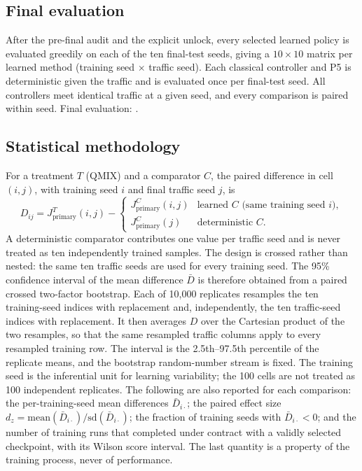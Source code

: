 \documentclass[review,12pt]{elsarticle}
\newcommand{\TBD}[1]{\textcolor{red}{\texttt{\detokenize{#1}}}}
\newcommand{\Jp}{J_{\mathrm{primary}}}
\begin{document}
\subsection{Final evaluation}
\label{subsec:final_eval}

After the pre-final audit and the explicit unlock, every selected learned
policy is evaluated greedily on each of the ten final-test seeds, giving
a $10\times10$ matrix per learned method (training seed $\times$ traffic
seed). Each classical controller and P5 is deterministic given the
traffic and is evaluated once per final-test seed. All controllers meet
identical traffic at a given seed, and every comparison is paired within
seed. Final evaluation: \TBD{TBD_AFTER_FINAL_EVALUATION}.

\subsection{Statistical methodology}
\label{subsec:statistics}

For a treatment $T$ (QMIX) and a comparator $C$, the paired difference in
cell $(i,j)$, with training seed $i$ and final traffic seed $j$, is
\begin{equation}
D_{ij}=\Jp^{T}(i,j)-
\begin{cases}
\Jp^{C}(i,j) & \text{learned $C$ (same training seed $i$)},\\
\Jp^{C}(j) & \text{deterministic $C$}.
\end{cases}
\label{eq:difference}
\end{equation}
A deterministic comparator contributes one value per traffic seed and
is never treated as ten independently trained samples. The design is
crossed rather than nested: the same ten traffic seeds are used for
every training seed. The 95\% confidence interval of the mean difference
$\bar D$ is therefore obtained from a paired crossed two-factor
bootstrap. Each of 10{,}000 replicates resamples the ten training-seed
indices with replacement and, independently, the ten traffic-seed
indices with replacement. It then averages $D$ over the Cartesian
product of the two resamples, so that the same resampled traffic columns
apply to every resampled training row. The interval is the 2.5th--97.5th
percentile of the replicate means, and the bootstrap random-number
stream is fixed.
The training seed is the inferential unit for learning variability; the
100 cells are not treated as 100 independent replicates. The following
are also reported for each comparison:
the per-training-seed mean differences $\bar D_{i\cdot}$; the paired
effect size $d_z=\mathrm{mean}(\bar D_{i\cdot})/\mathrm{sd}(\bar D_{i\cdot})$;
the fraction of training seeds with $\bar D_{i\cdot}<0$; and the number
of training runs that completed under contract with a validly selected
checkpoint, with its Wilson score interval. The last quantity is a
property of the training process, never of performance.
\end{document}
